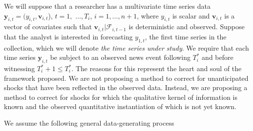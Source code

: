 \documentclass{uiucthesis2021}
\newcommand{\y}{\textbf{y}}
\newcommand{\x}{\textbf{v}}
\theoremstyle{definition}
\begin{document}
  We will suppose that a researcher has a multivariate time series data $\y_{i,t} = (y_{i,t}, \x_{i,t}$), $t = 1,$ $\ldots,  T_i$, $i = 1, \ldots, n+1$, where $y_{i,t}$ is scalar and $\x_{i,t}$ is a vector of covariates such that $\x_{i,t}|\mathcal{F}_{i,t-1}$ is deterministic and observed.  Suppose that the analyst is interested in forecasting $y_{1,t}$, the first time series in the collection, which we will denote \textit{the time series under study}.   We require that each time series $\y_{i,t}$ be subject to an observed news event following $T^*_i$ and before witnessing $T^*_i+1 \leq T_{i}^{*}$.  The reasons for this represent the heart and soul of the framework proposed.  We are not proposing a method to correct for unanticipated shocks that have been reflected in the observed data.  Instead, we are proposing a method to correct for shocks for which the qualitative kernel of information is known and the observed quantitative instantiation of which is not yet known. 
  
  We assume the following general data-generating process
  
\end{document}
